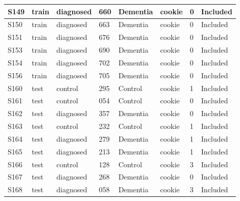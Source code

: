 \begin{center}
\begin{longtable}{|l|l|l|l|l|l|l|l|}
S149           & train                 & diagnosed         & 660     & Dementia       & cookie          & 0            & Included      \\ \hline
S150           & train                 & diagnosed         & 663     & Dementia       & cookie          & 0            & Included      \\ \hline
S151           & train                 & diagnosed         & 676     & Dementia       & cookie          & 0            & Included      \\ \hline
S153           & train                 & diagnosed         & 690     & Dementia       & cookie          & 0            & Included      \\ \hline
S154           & train                 & diagnosed         & 702     & Dementia       & cookie          & 0            & Included      \\ \hline
S156           & train                 & diagnosed         & 705     & Dementia       & cookie          & 0            & Included      \\ \hline
S160           & test                  & control           & 295     & Control        & cookie          & 1            & Included      \\ \hline
S161           & test                  & control           & 054     & Control        & cookie          & 0            & Included      \\ \hline
S162           & test                  & diagnosed         & 357     & Dementia       & cookie          & 0            & Included      \\ \hline
S163           & test                  & control           & 232     & Control        & cookie          & 1            & Included      \\ \hline
S164           & test                  & diagnosed         & 279     & Dementia       & cookie          & 1            & Included      \\ \hline
S165           & test                  & diagnosed         & 213     & Dementia       & cookie          & 1            & Included      \\ \hline
S166           & test                  & control           & 128     & Control        & cookie          & 3            & Included      \\ \hline
S167           & test                  & diagnosed         & 268     & Dementia       & cookie          & 0            & Included      \\ \hline
S168           & test                  & diagnosed         & 058     & Dementia       & cookie          & 3            & Included      \\ \hline

\end{longtable}
\end{center}
